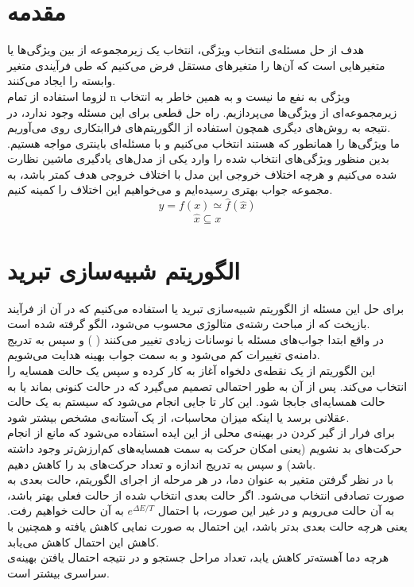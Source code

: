 \documentclass{article}
\begin{document}
\begin{multicols}{2}
\section{
مقدمه
}
هدف از حل مسئله‌ی انتخاب ویژگی، انتخاب یک زیرمجموعه از بین ویژگی‌ها یا متغیرهایی است که آن‌ها را متغیرهای مستقل فرض می‌کنیم که طی فرآیندی متغیر وابسته را ایجاد می‌کنند.\\
لزوما استفاده از تمام
{n}
ویژگی به نفع ما نیست و به همین خاطر به انتخاب زیرمجموعه‌ای از ویژگی‌ها می‌پردازیم. 
راه حل قطعی برای این مسئله وجود ندارد، در نتیجه به روش‌های دیگری همچون استفاده از الگوریتم‌های فراابتکاری روی می‌آوریم.\\
ما ویژگی‌ها را همانطور که هستند انتخاب می‌کنیم و با مسئله‌ای باینتری مواجه هستیم.
بدین منظور ویژگی‌های انتخاب شده را وارد یکی از مدل‌های یادگیری ماشین نظارت شده می‌کنیم و هرچه اختلاف خروجی این مدل با اختلاف خروجی هدف کمتر باشد، به مجموعه جواب بهتری رسیده‌ایم و می‌خواهیم این اختلاف را کمینه کنیم.
$$y = f(x) \simeq \hat{f}(\hat{x})$$
$$\hat{x} \subseteq x$$

\section{
الگوریتم شبیه‌سازی تبرید
}
برای حل این مسئله از الگوریتم شبیه‌سازی تبرید یا
استفاده می‌کنیم که در آن از فرآیند بازپخت که از مباحث رشته‌ی متالوژی محسوب می‌شود، الگو گرفته شده است.\\
در واقع ابتدا جواب‌های مسئله با نوسانات زیادی تغییر می‌کنند (
) و سپس به تدریج دامنه‌ی تغییرات کم می‌شود و به سمت جواب بهینه هدایت می‌شویم.\\
این الگوریتم از یک نقطه‌ی دلخواه آغاز به کار کرده و سپس یک حالت همسایه را انتخاب می‌کند. پس از آن به طور احتمالی تصمیم می‌گیرد که در حالت کنونی بماند یا به حالت همسایه‌ای جابجا شود. این کار تا جایی انجام می‌شود که سیستم به یک حالت عقلانی برسد یا اینکه میزان محاسبات، از یک آستانه‌ی مشخص بیشتر شود.\\
برای فرار از گیر کردن در بهینه‌ی محلی از این ایده استفاده می‌شود که مانع از انجام حرکت‌های بد نشویم (یعنی امکان حرکت به سمت همسایه‌های کم‌ارزش‌تر وجود داشته باشد) و سپس به تدریج اندازه و تعداد حرکت‌های بد را کاهش دهیم.\\
با در نظر گرفتن متغیر
به عنوان دما، در هر مرحله از اجرای الگوریتم، حالت بعدی به صورت تصادفی انتخاب می‌شود. اگر حالت بعدی انتخاب شده از حالت فعلی بهتر باشد، به آن حالت می‌رویم و در غیر این صورت، با احتمال 
$e^{\Delta E/T}$
به آن حالت خواهیم رفت. یعنی هرچه حالت بعدی بدتر باشد، این احتمال به صورت نمایی کاهش یافته و همچنین با کاهش
این احتمال کاهش می‌یابد.\\
هرچه دما آهسته‌تر کاهش یابد، تعداد مراحل جستجو و در نتیجه احتمال یافتن بهینه‌ی سراسری بیشتر است.


\end{multicols}
\end{document}
